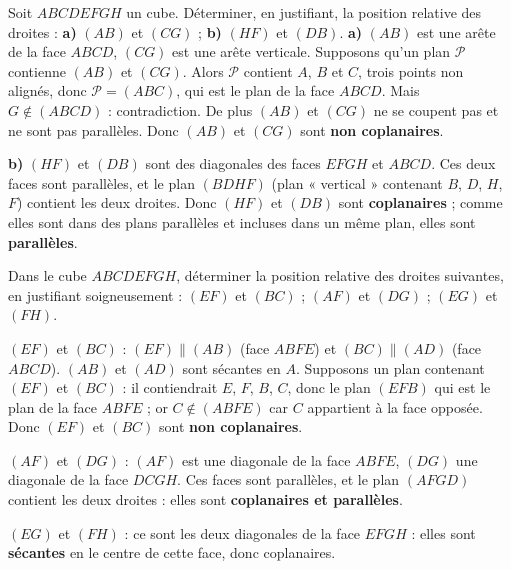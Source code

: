 \documentclass[11pt]{article}
\begin{document}
\begin{exoresolu}
Soit $ABCDEFGH$ un cube. Déterminer, en justifiant, la position relative des droites : \textbf{a)} $(AB)$ et $(CG)$ ; \textbf{b)} $(HF)$ et $(DB)$.
\tcblower
\textbf{a)} $(AB)$ est une arête de la face $ABCD$, $(CG)$ est une arête verticale. Supposons qu'un plan $\mathcal{P}$ contienne $(AB)$ et $(CG)$. Alors $\mathcal{P}$ contient $A$, $B$ et $C$, trois points non alignés, donc $\mathcal{P} = (ABC)$, qui est le plan de la face $ABCD$. Mais $G \notin (ABCD)$ : contradiction. De plus $(AB)$ et $(CG)$ ne se coupent pas et ne sont pas parallèles. Donc $(AB)$ et $(CG)$ sont \textbf{non coplanaires}.

\textbf{b)} $(HF)$ et $(DB)$ sont des diagonales des faces $EFGH$ et $ABCD$. Ces deux faces sont parallèles, et le plan $(BDHF)$ (plan « vertical » contenant $B$, $D$, $H$, $F$) contient les deux droites. Donc $(HF)$ et $(DB)$ sont \textbf{coplanaires} ; comme elles sont dans des plans parallèles et incluses dans un même plan, elles sont \textbf{parallèles}.
\end{exoresolu}

\begin{exercice}
Dans le cube $ABCDEFGH$, déterminer la position relative des droites suivantes, en justifiant soigneusement : $(EF)$ et $(BC)$ ; $(AF)$ et $(DG)$ ; $(EG)$ et $(FH)$.
\end{exercice}

\begin{corrige}[Exercice 1]
$(EF)$ et $(BC)$ : $(EF) \parallel (AB)$ (face $ABFE$) et $(BC) \parallel (AD)$ (face $ABCD$). $(AB)$ et $(AD)$ sont sécantes en $A$. Supposons un plan contenant $(EF)$ et $(BC)$ : il contiendrait $E$, $F$, $B$, $C$, donc le plan $(EFB)$ qui est le plan de la face $ABFE$ ; or $C \notin (ABFE)$ car $C$ appartient à la face opposée. Donc $(EF)$ et $(BC)$ sont \textbf{non coplanaires}.

$(AF)$ et $(DG)$ : $(AF)$ est une diagonale de la face $ABFE$, $(DG)$ une diagonale de la face $DCGH$. Ces faces sont parallèles, et le plan $(AFGD)$ contient les deux droites : elles sont \textbf{coplanaires et parallèles}.

$(EG)$ et $(FH)$ : ce sont les deux diagonales de la face $EFGH$ : elles sont \textbf{sécantes} en le centre de cette face, donc coplanaires.
\end{corrige}
\end{document}
